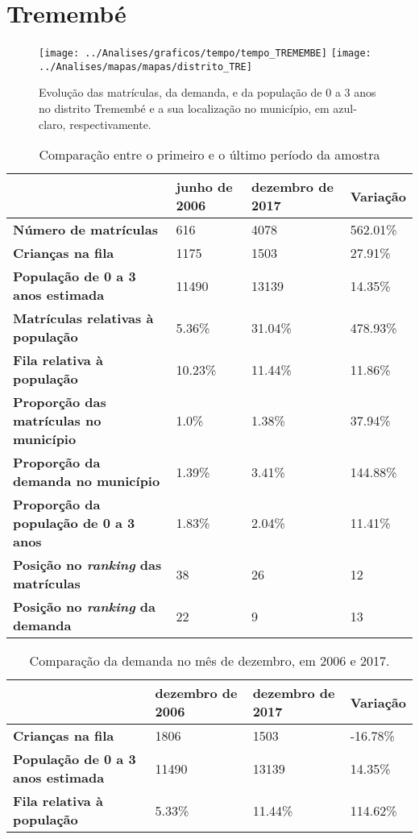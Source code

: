 \section{Tremembé}
\begin{figure}[H]
\centering
\texttt{[image: ../Analises/graficos/tempo/tempo\_TREMEMBE]}
\texttt{[image: ../Analises/mapas/mapas/distrito\_TRE]}
\caption{Evolução das matrículas, da demanda, e da população de 0 a 3 anos no distrito Tremembé e a sua localização no município, em azul-claro, respectivamente.}
\end{figure}
\begin{table}[H]
\begin{tabular}{l|l|l|l}
\textbf{}                                      & \textbf{junho de 2006}       & \textbf{dezembro de 2017}    & \textbf{Variação} \\ \hline
\textbf{Número de matrículas}                  & 616 & 4078 & 562.01\% \\ \hline
\textbf{Crianças na fila}                      & 1175 & 1503 & 27.91\% \\ \hline
\textbf{População de 0 a 3 anos estimada}      & 11490 & 13139 & 14.35\% \\ \hline
\textbf{Matrículas relativas à população}      & 5.36\% & 31.04\% & 478.93\% \\ \hline
\textbf{Fila relativa à população}             & 10.23\% & 11.44\% & 11.86\% \\ \hline
\textbf{Proporção das matrículas no município} & 1.0\% & 1.38\% & 37.94\% \\ \hline
\textbf{Proporção da demanda no município}     & 1.39\% & 3.41\% & 144.88\% \\ \hline
\textbf{Proporção da população de 0 a 3 anos}  & 1.83\% & 2.04\% & 11.41\% \\ \hline
\textbf{Posição no \textit{ranking} das matrículas}     & 38 & 26 & 12 \\ \hline
\textbf{Posição no \textit{ranking} da demanda}         & 22 & 9 & 13 \\ 
\end{tabular}
\caption{Comparação entre o primeiro e o último período da amostra}
\end{table}
\begin{table}[H]
\begin{tabular}{l|l|l|l}
\textbf{}                                 & \textbf{dezembro de 2006} & \textbf{dezembro de 2017} & \textbf{Variação} \\ \hline
\textbf{Crianças na fila}                      & 1806 & 1503 & -16.78\% \\ \hline
\textbf{População de 0 a 3 anos estimada}      & 11490 & 13139 & 14.35\% \\ \hline
\textbf{Fila relativa à população}             & 5.33\% & 11.44\% & 114.62\% \\
\end{tabular}
\caption{Comparação da demanda no mês de dezembro, em 2006 e 2017.}
\end{table}

